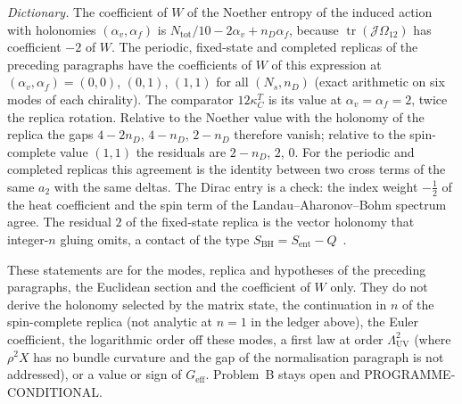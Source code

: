 \emph{Dictionary.} The coefficient of \(W\) of the Noether entropy of the induced action with holonomies \((\alpha_v,\alpha_f)\) is \(N_{\mathrm{tot}}/10-2\alpha_v+n_D\alpha_f\), because \(\operatorname{tr}(\mathcal J\Omega_{12})\) has coefficient \(-2\) of \(W\). The periodic, fixed-state and completed replicas of the preceding paragraphs have the coefficients of \(W\) of this expression at \((\alpha_v,\alpha_f)=(0,0)\), \((0,1)\), \((1,1)\) for all \((N_s,n_D)\) (exact arithmetic on six modes of each chirality). The comparator \(12\kappa_C^T\) is its value at \(\alpha_v=\alpha_f=2\), twice the replica rotation. Relative to the Noether value with the holonomy of the replica the gaps \(4-2n_D\), \(4-n_D\), \(2-n_D\) therefore vanish; relative to the spin-complete value \((1,1)\) the residuals are \(2-n_D\), \(2\), \(0\). For the periodic and completed replicas this agreement is the identity between two cross terms of the same \(a_2\) with the same deltas. The Dirac entry is a check: the index weight \(-\tfrac12\) of the heat coefficient and the spin term of the Landau--Aharonov--Bohm spectrum agree. The residual \(2\) of the fixed-state replica is the vector holonomy that integer-\(n\) gluing omits, a contact of the type \(S_{\mathrm{BH}}=S_{\mathrm{ent}}-Q\)~\cite{FrolovFursaev1997}.

These statements are for the modes, replica and hypotheses of the preceding paragraphs, the Euclidean section and the coefficient of \(W\) only. They do not derive the holonomy selected by the matrix state, the continuation in \(n\) of the spin-complete replica (not analytic at \(n=1\) in the ledger above), the Euler coefficient, the logarithmic order off these modes, a first law at order \(\Lambda_{\mathrm{UV}}^2\) (where \(\rho^2X\) has no bundle curvature and the gap of the normalisation paragraph is not addressed), or a value or sign of \(G_{\mathrm{eff}}\). Problem~B stays open and PROGRAMME-CONDITIONAL.

